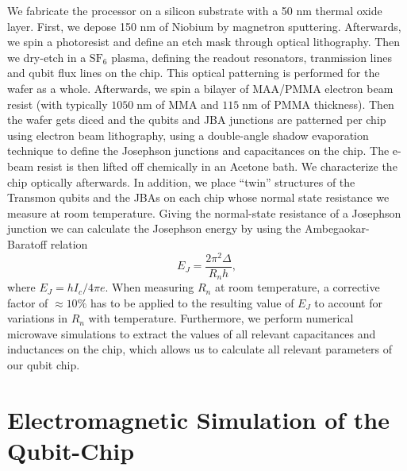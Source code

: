 We fabricate the processor on a silicon substrate with a 50 nm thermal oxide layer. First, we depose 150 nm of Niobium by magnetron sputtering. Afterwards, we spin a photoresist and define an etch mask through optical lithography. Then we dry-etch in a $\mathrm{SF}_6$ plasma, defining the readout resonators, tranmission lines and qubit flux lines on the chip. This optical patterning is performed for the wafer as a whole. Afterwards, we spin a bilayer of MAA/PMMA electron beam resist (with typically $1050\;\mathrm{nm}$ of MMA and $115\;\mathrm{nm}$ of PMMA thickness). Then the wafer gets diced and the qubits and JBA junctions are patterned per chip using electron beam lithography, using a double-angle shadow evaporation technique to define the Josephson junctions and capacitances on the chip. The e-beam resist is then lifted off chemically in an Acetone bath. We characterize the chip optically afterwards. In addition, we place ``twin'' structures of the Transmon qubits and the JBAs on each chip whose normal state resistance we measure at room temperature. Giving the normal-state resistance of a Josephson junction we can calculate the Josephson energy by using the Ambegaokar-Baratoff relation
%
\begin{equation}
E_J = \frac{2\pi^2 \Delta}{R_n h},
\end{equation}
%
where $E_J = h I_c / 4\pi e$. When measuring $R_n$ at room temperature, a corrective factor of $\approx 10\%$ has to be applied to the resulting value of $E_J$ to account for variations in $R_n$ with temperature. Furthermore, we perform numerical microwave simulations to extract the values of all relevant capacitances and inductances on the chip, which allows us to calculate all relevant parameters of our qubit chip.

\section{Electromagnetic Simulation of the Qubit-Chip}

